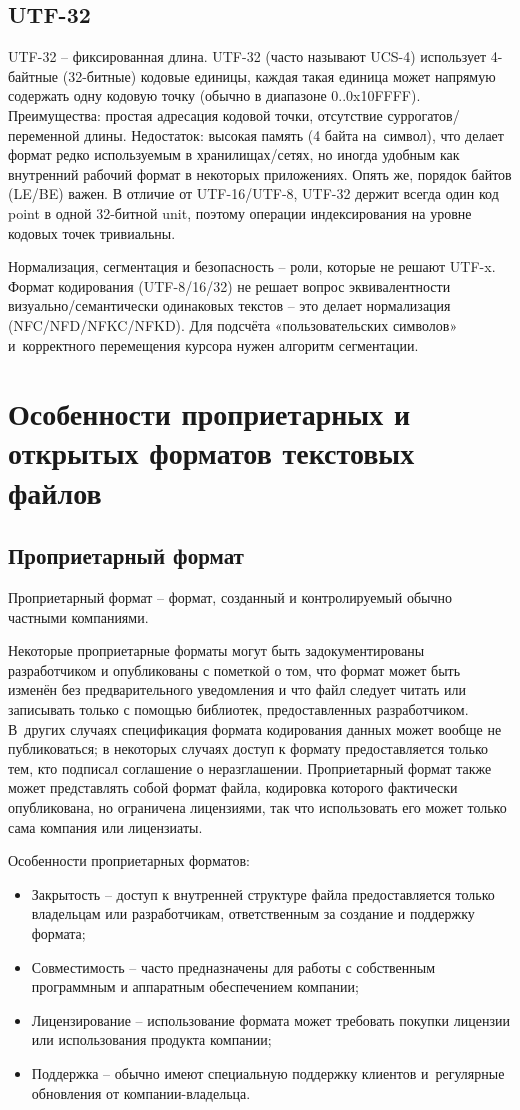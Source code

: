\documentclass{ou}
\begin{document}
\subsection{UTF-32}
UTF-32 -- фиксированная длина. UTF-32 (часто называют UCS-4) использует 4-байтные (32-битные) кодовые единицы, каждая такая единица может напрямую содержать одну кодовую точку (обычно в диапазоне 0..0x10FFFF). Преимущества: простая адресация кодовой точки, отсутствие суррогатов/переменной длины. Недостаток: высокая память (4 байта на~символ), что делает формат редко используемым в хранилищах/сетях, но иногда удобным как внутренний рабочий формат в некоторых приложениях. Опять же, порядок байтов (LE/BE) важен. В отличие от UTF-16/UTF-8, UTF-32 держит всегда один код point в одной 32-битной unit, поэтому операции индексирования на уровне кодовых точек тривиальны.

Нормализация, сегментация и безопасность -- роли, которые не решают UTF-x. Формат кодирования (UTF-8/16/32) не решает вопрос эквивалентности визуально/семантически одинаковых текстов -- это делает нормализация (NFC/NFD/NFKC/NFKD). Для подсчёта «пользовательских символов» и~корректного перемещения курсора нужен алгоритм сегментации.
\newpage
\section{Особенности проприетарных и открытых форматов текстовых файлов}
\subsection{Проприетарный формат}
Проприетарный формат -- формат, созданный и контролируемый обычно частными компаниями.

Некоторые проприетарные форматы могут быть задокументированы разработчиком и опубликованы с пометкой о том, что формат может быть изменён без предварительного уведомления и что файл следует читать или записывать только с помощью библиотек, предоставленных разработчиком. В~других случаях спецификация формата кодирования данных может вообще не публиковаться; в некоторых случаях доступ к формату предоставляется только тем, кто подписал соглашение о неразглашении. Проприетарный формат также может представлять собой формат файла, кодировка которого фактически опубликована, но ограничена лицензиями, так что использовать его может только сама компания или лицензиаты.

Особенности проприетарных форматов:
\begin{itemize}[label=-, leftmargin=0em, itemindent=3.35em, nosep]
\item Закрытость -- доступ к внутренней структуре файла предоставляется только владельцам или разработчикам, ответственным за создание и поддержку формата;
\item Совместимость -- часто предназначены для работы с собственным программным и аппаратным обеспечением компании;
\item Лицензирование -- использование формата может требовать покупки лицензии или использования продукта компании;
\item Поддержка -- обычно имеют специальную поддержку клиентов и~регулярные обновления от компании-владельца.
\end{itemize}
\end{document}
